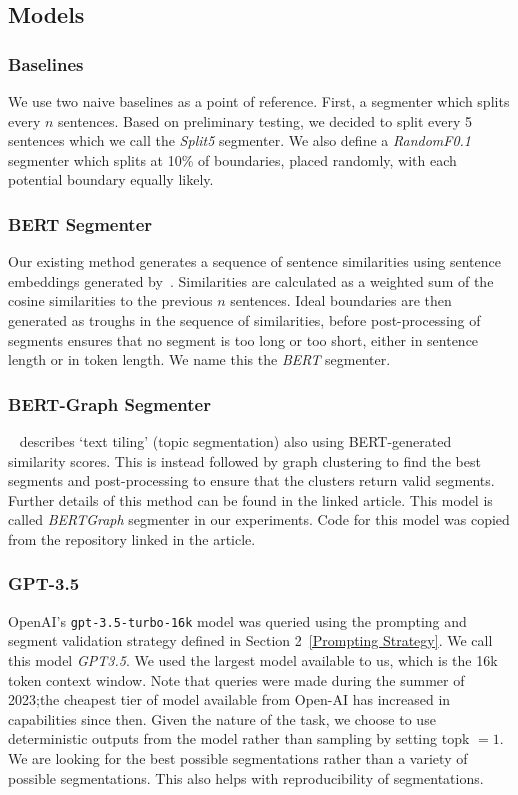 \subsection{Models}

\subsubsection{Baselines}

We use two naive baselines as a point of reference. First, a segmenter which splits every $n$ sentences. Based on preliminary testing, we decided to split every 5 sentences which we call the \emph{Split5} segmenter. We also define a \emph{RandomF0.1} segmenter which splits at 10\% of boundaries, placed randomly, with each potential boundary equally likely.

\subsubsection{BERT Segmenter}

Our existing method generates a sequence of sentence similarities using sentence embeddings generated by~\cite{SentenceBERT}. Similarities are calculated as a weighted sum of the cosine similarities to the previous $n$ sentences. Ideal boundaries are then generated as troughs in the sequence of similarities, before post-processing of segments ensures that no segment is too long or too short, either in sentence length or in token length. We name this the \emph{BERT} segmenter.

\subsubsection{BERT-Graph Segmenter}

~\cite{MasimilianoSegmenter} describes `text tiling' (topic segmentation) also using BERT-generated similarity scores. This is instead followed by graph clustering to find the best segments and post-processing to ensure that the clusters return valid segments. Further details of this method can be found in the linked article. This model is called \emph{BERTGraph} segmenter in our experiments. Code for this model was copied from the repository linked in the article.

\subsubsection{GPT-3.5}

OpenAI's \texttt{gpt-3.5-turbo-16k} model was queried using the prompting and segment validation strategy defined in Section 2~\ref{Prompting Strategy}. We call this model \emph{GPT3.5}. We used the largest model available to us, which is the 16k token context window. Note that queries were made during the summer of 2023;the cheapest tier of model available from Open-AI has increased in capabilities since then. Given the nature of the task, we choose to use deterministic outputs from the model rather than sampling by setting topk $=1$. We are looking for the best possible segmentations rather than a variety of possible segmentations. This also helps with reproducibility of segmentations.

